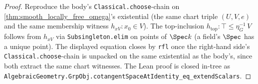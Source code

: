 \begin{proof}
  
  \leanok
  Reproduce the body's \texttt{Classical.choose}-chain on \cref{thm:smooth_locally_free_omega}'s existential (the same chart triple \((U, V, e)\) and the same membership witness \(h_{xV} \colon x_{0} \in V\)). The top-inclusion \(h_{\mathrm{top}} \colon \top \leq \eta_{G}^{-1}\,V\) follows from \(h_{xV}\) via \texttt{Subsingleton.elim} on points of \(\Spec k\) (a field's \(\Spec\) has a unique point). The displayed equation closes by \texttt{rfl} once the right-hand side's \texttt{Classical.choose}-chain is unpacked on the same existential as the body's, since both extract the same chart witnesses. The Lean proof is closed in-tree as \texttt{AlgebraicGeometry.GrpObj.cotangentSpaceAtIdentity\_eq\_extendScalars}.
\end{proof}

